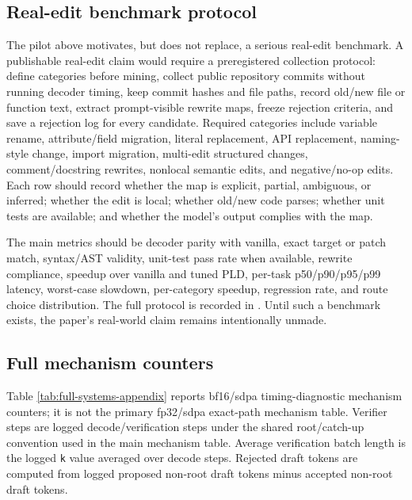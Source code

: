 \documentclass[11pt,a4paper]{article}
\begin{document}
\subsection{Real-edit benchmark protocol}
\label{app:real-edit-protocol}

The pilot above motivates, but does not replace, a serious real-edit
benchmark. A publishable real-edit claim would require a preregistered
collection protocol: define categories before mining, collect public
repository commits without running decoder timing, keep commit hashes and
file paths, record old/new file or function text, extract prompt-visible
rewrite maps, freeze rejection criteria, and save a rejection log for every
candidate. Required categories include variable rename, attribute/field
migration, literal replacement, API replacement, naming-style change, import
migration, multi-edit structured changes, comment/docstring rewrites,
nonlocal semantic edits, and negative/no-op edits. Each row should record
whether the map is explicit, partial, ambiguous, or inferred; whether the edit
is local; whether old/new code parses; whether unit tests are available; and
whether the model's output complies with the map.

The main metrics should be decoder parity with vanilla, exact target or patch
match, syntax/AST validity, unit-test pass rate when available, rewrite
compliance, speedup over vanilla and tuned PLD, per-task p50/p90/p95/p99
latency, worst-case slowdown, per-category speedup, regression rate, and route
choice distribution. The full protocol is recorded in
. Until
such a benchmark exists, the paper's real-world claim remains intentionally
unmade.

\subsection{Full mechanism counters}

Table \ref{tab:full-systems-appendix} reports bf16/sdpa timing-diagnostic
mechanism counters; it is not the primary fp32/sdpa exact-path mechanism table.
Verifier steps are logged decode/verification steps under the shared
root/catch-up convention used in the main mechanism table. Average verification
batch length is the logged \texttt{k} value averaged over decode steps.
Rejected draft tokens are computed from logged proposed non-root draft tokens
minus accepted non-root draft tokens.
\end{document}
